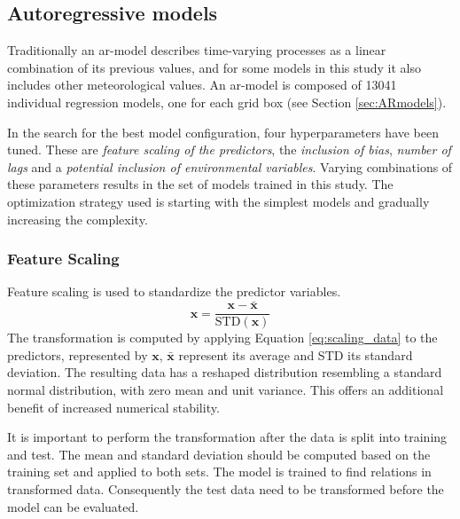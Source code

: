 \subsection{Autoregressive models}
Traditionally an \acrshort{ar}-model describes time-varying processes as a linear combination of its previous values, and for some models in this study it also includes other meteorological values. An \acrshort{ar}-model is composed of 13041 individual regression models, one for each grid box (see Section \ref{sec:ARmodels}). 

In the search for the best model configuration, four hyperparameters have been tuned. These are
\textit{feature scaling of the predictors}, the \textit{inclusion of bias}, \textit{number of lags} and a \textit{potential inclusion of environmental variables}. Varying combinations of these parameters results in the set of models trained in this study. 
The optimization strategy used is starting with the simplest models and gradually increasing the complexity.

\subsubsection{Feature Scaling} \label{sec:scaling_predictors}
Feature scaling is used to standardize the predictor variables.
\begin{equation} \label{eq:scaling_data}
    \mathbf{x} = \frac{\mathbf{x} - \bar{\mathbf{x}}}{\text{STD}(\mathbf{x})}
\end{equation}
The transformation is computed by applying Equation \eqref{eq:scaling_data} to the predictors, represented by $\mathbf{x}$, $\bar{\mathbf{x}}$ represent its average and STD its standard deviation. The resulting data has a reshaped distribution resembling a standard normal distribution, with zero mean and unit variance. This offers an additional benefit of increased numerical stability. %

It is important to perform the transformation after the data is split into training and test. The mean and standard deviation should be computed based on the training set and applied to both sets. The model is trained to find relations in transformed data. Consequently the test data need to be transformed before the model can be evaluated. 

